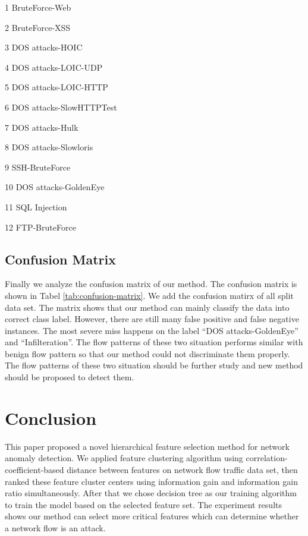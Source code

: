 \documentclass{ieeeaccess}
\theoremstyle{definition}
\begin{document}
\begin{table}
\begin{threeparttable}[b]
\begin{tabularx}{\textwidth}{@{}l*{15}{C}c@{}}
            \bottomrule
        \end{tabularx}
        \begin{tablenotes}
            \item[1] BruteForce-Web
            \item[2] BruteForce-XSS
            \item[3] DOS attacks-HOIC
            \item[4] DOS attacks-LOIC-UDP
            \item[5] DOS attacks-LOIC-HTTP
            \item[6] DOS attacks-SlowHTTPTest
            \item[7] DOS attacks-Hulk 
            \item[8] DOS attacks-Slowloris
            \item[9] SSH-BruteForce
            \item[10] DOS attacks-GoldenEye
            \item[11] SQL Injection
            \item[12] FTP-BruteForce          
        \end{tablenotes}
    \end{threeparttable}
\end{table}

\subsection{Confusion Matrix}

Finally we analyze the confusion matrix of our method. The confusion matrix is shown in Tabel \ref{tab:confusion-matrix}. We add the confusion matirx of all split data set. The matrix shows that our method can mainly classify the data into correct class label. However, there are still many false positive and false negative instances. The most severe miss happens on the label ``DOS attacks-GoldenEye'' and ``Infilteration''. The flow patterns of these two situation performs similar with benign flow pattern so that our method could not discriminate them properly. The flow patterns of these two situation should be further study and new method should be proposed to detect them.  

\section{Conclusion}
\label{sec:conclusion}

This paper proposed a novel hierarchical feature selection method for network anomaly detection. We applied feature clustering algorithm using correlation-coefficient-based distance between features on network flow traffic data set, then ranked these feature cluster centers using information gain and information gain ratio simultaneously. After that we chose decision tree as our training algorithm to train the model based on the selected feature set. The experiment results shows our method can select more critical features which can determine whether a network flow is an attack. 
\end{document}
